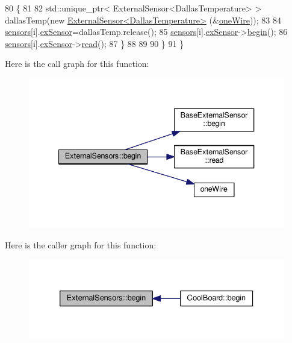 \begin{DoxyCode}
80         \{
81 
82             std::unique\_ptr< ExternalSensor<DallasTemperature> > dallasTemp(\textcolor{keyword}{new} 
      \hyperlink{class_external_sensor_3_01_dallas_temperature_01_4}{ExternalSensor<DallasTemperature>} (&\hyperlink{_external_sensors_8cpp_af39fa3dad1ba161b384c0b26b8145e65}{oneWire}));
83              
84             \hyperlink{class_external_sensors_a284233f884fcf00154a44740cf1d9e1e}{sensors}[i].\hyperlink{struct_external_sensors_1_1sensor_a9bca150fd468b8d0e090e6d72c5c2b48}{exSensor}=dallasTemp.release();
85             \hyperlink{class_external_sensors_a284233f884fcf00154a44740cf1d9e1e}{sensors}[i].\hyperlink{struct_external_sensors_1_1sensor_a9bca150fd468b8d0e090e6d72c5c2b48}{exSensor}->\hyperlink{class_base_external_sensor_a87d132803d4f4fdd4e66332809f0c9a0}{begin}();
86             \hyperlink{class_external_sensors_a284233f884fcf00154a44740cf1d9e1e}{sensors}[i].\hyperlink{struct_external_sensors_1_1sensor_a9bca150fd468b8d0e090e6d72c5c2b48}{exSensor}->\hyperlink{class_base_external_sensor_a1564f16deacf57b51b9948ac29db4291}{read}();
87         \}
88         
89         
90     \}
91 \}
\end{DoxyCode}
Here is the call graph for this function\+:\nopagebreak
\begin{figure}[H]
\begin{center}
\leavevmode
\includegraphics[width=340pt]{d1/d2f/class_external_sensors_a58ede0d786a86417254708870f04a21e_cgraph}
\end{center}
\end{figure}
Here is the caller graph for this function\+:\nopagebreak
\begin{figure}[H]
\begin{center}
\leavevmode
\includegraphics[width=326pt]{d1/d2f/class_external_sensors_a58ede0d786a86417254708870f04a21e_icgraph}
\end{center}
\end{figure}
\mbox{\label{class_external_sensors_a862a4bd11346b37270d0244c2adabe5a}} 
